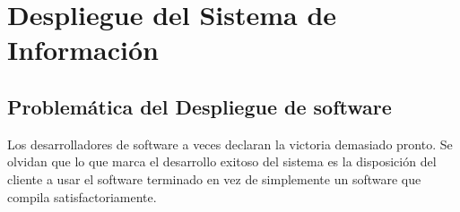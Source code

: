\section{Despliegue del Sistema de Información}
\subsection{Problemática del Despliegue de software}
Los desarrolladores de software a veces declaran la victoria demasiado pronto. Se olvidan que lo que marca el desarrollo exitoso del sistema es la disposición del cliente a usar el software terminado en vez de simplemente un software que compila satisfactoriamente.
